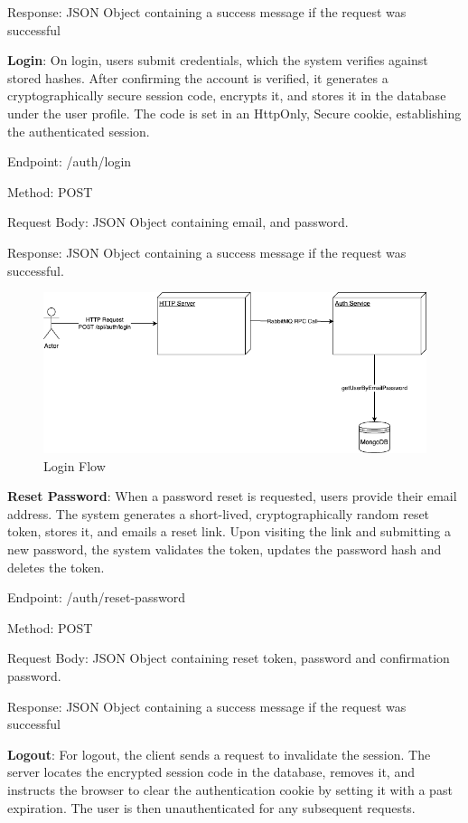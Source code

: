 Response: JSON Object containing a success message if the request was successful


\textbf{Login}: On login, users submit credentials, which the system verifies against stored hashes. After confirming the account is verified, it generates a cryptographically secure session code, encrypts it, and stores it in the database under the user profile. The code is set in an HttpOnly, Secure cookie, establishing the authenticated session.

Endpoint: /auth/login

Method: POST

Request Body: JSON Object containing email, and password.

Response: JSON Object containing a success message if the request was successful.

\begin{figure}[H]
  \centering
  \includegraphics[width=1\linewidth]{licenta-login.drawio.png}
  \caption*{Login Flow}
  \label{fig:login-flow}
\end{figure}

\textbf{Reset Password}: When a password reset is requested, users provide their email address. The system generates a short-lived, cryptographically random reset token, stores it, and emails a reset link. Upon visiting the link and submitting a new password, the system validates the token, updates the password hash and deletes the token.

Endpoint: /auth/reset-password

Method: POST

Request Body: JSON Object containing reset token, password and confirmation password.

Response: JSON Object containing a success message if the request was successful


\textbf{Logout}: For logout, the client sends a request to invalidate the session. The server locates the encrypted session code in the database, removes it, and instructs the browser to clear the authentication cookie by setting it with a past expiration. The user is then unauthenticated for any subsequent requests.

